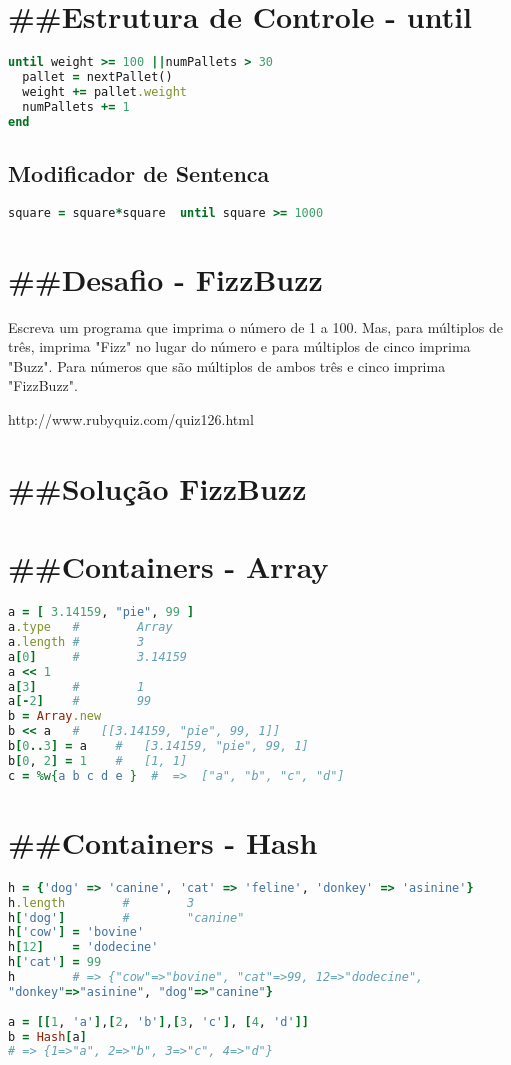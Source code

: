 \documentclass[serif,mathserif]{article}
\begin{document}
\section{\#\#Estrutura de Controle -  until} 
\begin{lstlisting}[language=ruby]
until weight >= 100 ||numPallets > 30
  pallet = nextPallet()
  weight += pallet.weight
  numPallets += 1
end
\end{lstlisting}

\subsection {Modificador de Sentenca}
\begin{lstlisting}[language=ruby]
square = square*square  until square >= 1000
\end{lstlisting}

\section{\#\#Desafio - FizzBuzz}
Escreva um programa que imprima o número de 1 a 100.
Mas, para múltiplos de três, imprima  "Fizz" no lugar do
número e para múltiplos de cinco imprima "Buzz". Para
números que são múltiplos de ambos três e cinco
imprima "FizzBuzz".

http://www.rubyquiz.com/quiz126.html

\section{\#\#Solução FizzBuzz}



\section{\#\#Containers - Array}
\begin{lstlisting}[language=ruby]
a = [ 3.14159, "pie", 99 ]
a.type   #        Array
a.length #        3
a[0]     #        3.14159
a << 1
a[3]     #        1
a[-2]    #        99
b = Array.new
b << a   #   [[3.14159, "pie", 99, 1]]
b[0..3] = a    #   [3.14159, "pie", 99, 1]
b[0, 2] = 1    #   [1, 1]
c = %w{a b c d e }  #  =>  ["a", "b", "c", "d"]
\end{lstlisting}


\section{\#\#Containers - Hash}
\begin{lstlisting}[language=ruby]
h = {'dog' => 'canine', 'cat' => 'feline', 'donkey' => 'asinine'}
h.length        #        3
h['dog']        #        "canine"
h['cow'] = 'bovine'
h[12]    = 'dodecine'
h['cat'] = 99
h        # => {"cow"=>"bovine", "cat"=>99, 12=>"dodecine",
"donkey"=>"asinine", "dog"=>"canine"}
  
a = [[1, 'a'],[2, 'b'],[3, 'c'], [4, 'd']]
b = Hash[a]
# => {1=>"a", 2=>"b", 3=>"c", 4=>"d"}
\end{lstlisting}
\end{document}
